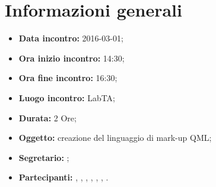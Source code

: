 \newpage
\section{Informazioni generali}
\begin{itemize}
\item \textbf{Data incontro:} 2016-03-01;
\item \textbf{Ora inizio incontro:} 14:30;
\item \textbf{Ora fine incontro:} 16:30;
\item \textbf{Luogo incontro:} LabTA;
\item \textbf{Durata:} 2 Ore;
\item \textbf{Oggetto:} creazione del linguaggio di mark-up QML;
\item \textbf{Segretario:} \SM;
\item \textbf{Partecipanti:} \AF, \FB, \GN, \GR, \MV, \MP, \SM.

\end{itemize}

